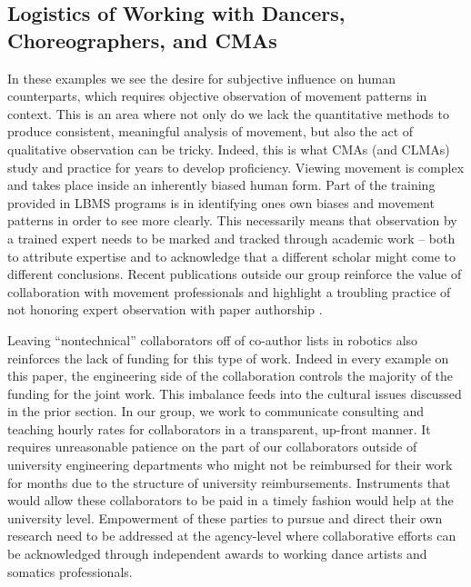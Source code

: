 \documentclass[arts,article,submit,moreauthors,pdftex,10pt,a4paper]{mdpi}
\begin{document}
\subsection{Logistics of Working with Dancers, Choreographers, and CMAs}
 In these examples we see the desire for subjective influence on human counterparts, which requires objective observation of movement patterns in context.  This is an area where not only do we lack the quantitative methods to produce consistent, meaningful analysis of movement, but also the act of qualitative observation can be tricky.  Indeed, this is what CMAs (and CLMAs) study and practice for years to develop proficiency.  Viewing movement is complex and takes place inside an inherently biased human form.  Part of the training provided in LBMS programs is in identifying ones own biases and movement patterns in order to see more clearly.  This necessarily means that observation by a trained expert needs to be marked and tracked through academic work -- both to attribute expertise and to acknowledge that a different scholar might come to different conclusions.  Recent publications outside our group reinforce the value of collaboration with movement professionals and highlight a troubling practice of not honoring expert observation with paper authorship \cite{salaris2017robot}.
 
Leaving ``nontechnical'' collaborators off of co-author lists in robotics also reinforces the lack of funding for this type of work.  Indeed in every example on this paper, the engineering side of the collaboration controls the majority of the funding for the joint work.  This imbalance feeds into the cultural issues discussed in the prior section.  In our group, we work to communicate consulting and teaching hourly rates for collaborators in a transparent, up-front manner.  It requires unreasonable patience on the part of our collaborators outside of university engineering departments who might not be reimbursed for their work for months due to the structure of university reimbursements.  Instruments that would allow these collaborators to be paid in a timely fashion would help at the university level.  Empowerment of these parties to pursue and direct their own research need to be addressed at the agency-level where collaborative efforts can be acknowledged through independent awards to working dance artists and somatics professionals.

\end{document}
